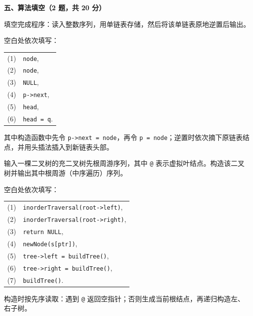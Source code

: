 \textbf{五、算法填空（2 题，共 20 分）}
\begin{question}[单链表逆置]
填空完成程序：读入整数序列，用单链表存储，然后将该单链表原地逆置后输出。
\begin{solution}
空白处依次填写：
\begin{center}
\small
\begin{tabular}{@{}r l@{}}
(1)&\texttt{node},\\
(2)&\texttt{node},\\
(3)&\texttt{NULL},\\
(4)&\texttt{p->next},\\
(5)&\texttt{head},\\
(6)&\texttt{head = q}.
\end{tabular}
\end{center}
其中构造函数中先令 \texttt{p->next = node}，再令 \texttt{p = node}；逆置时依次摘下原链表结点，并用头插法插入到新链表头部。
\end{solution}
\end{question}

\begin{question}[由充二叉树先序序列构造二叉树]
输入一棵二叉树的充二叉树先根周游序列，其中 \texttt{@} 表示虚拟叶结点。构造该二叉树并输出其中根周游（中序遍历）序列。
\begin{solution}
空白处依次填写：
\begin{center}
\small
\begin{tabular}{@{}r l@{}}
(1)&\texttt{inorderTraversal(root->left)},\\
(2)&\texttt{inorderTraversal(root->right)},\\
(3)&\texttt{return NULL},\\
(4)&\texttt{newNode(s[ptr])},\\
(5)&\texttt{tree->left = buildTree()},\\
(6)&\texttt{tree->right = buildTree()},\\
(7)&\texttt{buildTree()}.
\end{tabular}
\end{center}
构造时按先序读取：遇到 \texttt{@} 返回空指针；否则生成当前根结点，再递归构造左、右子树。
\end{solution}
\end{question}
